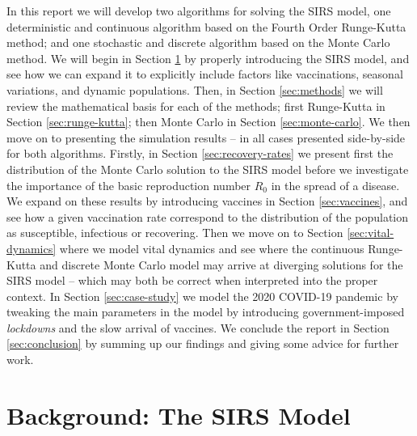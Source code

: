 \documentclass[]{article}
\begin{document}
In this report we will develop two algorithms for solving the SIRS model, one deterministic and continuous algorithm based on the Fourth Order Runge-Kutta method; and one stochastic and discrete algorithm based on the Monte Carlo method. We will begin in Section \ref{sec:background-sirs} by properly introducing the SIRS model, and see how we can expand it to explicitly include factors like vaccinations, seasonal variations, and dynamic populations. Then, in Section \ref{sec:methods} we will review the mathematical basis for each of the methods; first Runge-Kutta in Section \ref{sec:runge-kutta}; then Monte Carlo in Section \ref{sec:monte-carlo}. We then move on to presenting the simulation results -- in all cases presented side-by-side for both algorithms. Firstly, in Section \ref{sec:recovery-rates} we present first the distribution of the Monte Carlo solution to the SIRS model before we investigate the importance of the basic reproduction number $R_0$ in the spread of a disease. We expand on these results by introducing vaccines in Section \ref{sec:vaccines}, and see how a given vaccination rate correspond to the distribution of the population as susceptible, infectious or recovering. Then we move on to Section \ref{sec:vital-dynamics} where we model vital dynamics and see where the continuous Runge-Kutta and discrete Monte Carlo model may arrive at diverging solutions for the SIRS model -- which may both be correct when interpreted into the proper context. In Section \ref{sec:case-study} we model the 2020 COVID-19 pandemic by tweaking the main parameters in the model by introducing government-imposed \textit{lockdowns} and the slow arrival of vaccines. We conclude the report in Section \ref{sec:conclusion} by summing up our findings and giving some advice for further work.

\section{Background: The SIRS Model} \label{sec:background-sirs}
\end{document}
